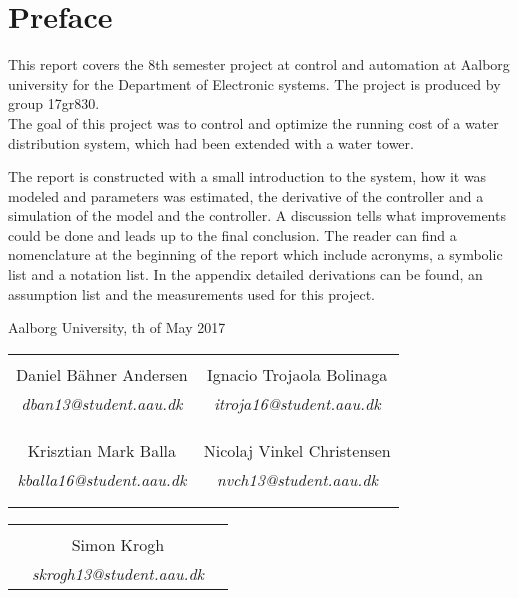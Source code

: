 \chapter*{Preface}

This report covers the 8th semester project at control and automation at Aalborg university for the Department of Electronic systems. The project is produced by group 17gr830.\\
The goal of this project was to control and optimize the running cost of a water distribution system, which had been extended with a water tower. 

The report is constructed with a small introduction to the system, how it was modeled and parameters was estimated, the derivative of the controller and a simulation of the model and the controller. A discussion tells what improvements could be done and leads up to the final conclusion. The reader can find a nomenclature at the beginning of the report which include acronyms, a symbolic list and a notation list. In the appendix detailed derivations can be found, an assumption list and the measurements used for this project.



\hfill Aalborg University, th of May 2017




\vfill

\begin{table}[H]
	\centering
		\begin{tabular}{c c }
			\underline{\phantom{mmmmmmmmmmmmmmmmmmm}}       & \underline{\phantom{mmmmmmmmmmmmmmmmmmm}} \\
			Daniel Bähner Andersen			 & Ignacio Trojaola Bolinaga  \\
			\textit{dban13@student.aau.dk} & \textit{itroja16@student.aau.dk}\\
			&\\
			&\\
			\underline{\phantom{mmmmmmmmmmmmmmmmmmm}}       & \underline{\phantom{mmmmmmmmmmmmmmmmmmm}} \\
			Krisztian Mark Balla			 & Nicolaj Vinkel Christensen \\
			\textit{kballa16@student.aau.dk} & \textit{nvch13@student.aau.dk} \\
			&\\
			&\\	
		\end{tabular}
		\begin{tabular}{c c c}
			& \underline{\phantom{mmmmmmmmmmmmmmmmmmm}} 	& \\
			& Simon Krogh					& \\
			& \textit{skrogh13@student.aau.dk}		& \\
		\end{tabular}
\end{table}